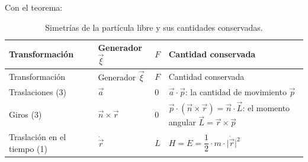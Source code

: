 \documentclass[11pt,a4paper,spanish]{book}
\begin{document}
Con el teorema:

\begin{longtable}[]{@{}
  >{\raggedright\arraybackslash}p{}
  >{\raggedright\arraybackslash}p{}
  >{\raggedright\arraybackslash}p{}
  >{\raggedright\arraybackslash}p{}@{}}
\caption{Simetrías de la partícula libre y sus cantidades
conservadas.}\tabularnewline
\toprule\noalign{}
\begin{minipage}[b]{\linewidth}\raggedright
Transformación
\end{minipage} & \begin{minipage}[b]{\linewidth}\raggedright
Generador \(\vec{\xi}\)
\end{minipage} & \begin{minipage}[b]{\linewidth}\raggedright
\(F\)
\end{minipage} & \begin{minipage}[b]{\linewidth}\raggedright
Cantidad conservada
\end{minipage} \\
\midrule\noalign{}
\endfirsthead
\toprule\noalign{}
\begin{minipage}[b]{\linewidth}\raggedright
Transformación
\end{minipage} & \begin{minipage}[b]{\linewidth}\raggedright
Generador \(\vec{\xi}\)
\end{minipage} & \begin{minipage}[b]{\linewidth}\raggedright
\(F\)
\end{minipage} & \begin{minipage}[b]{\linewidth}\raggedright
Cantidad conservada
\end{minipage} \\
\midrule\noalign{}
\endhead
\bottomrule\noalign{}
\endlastfoot
Traslaciones (3) & \(\vec{a}\) & \(0\) & \(\vec{a} \cdot \vec{p}\): la
cantidad de movimiento \(\vec{p}\) \\
Giros (3) & \(\vec{n} \times \vec{r}\) & \(0\) &
\(\vec{p} \cdot (\vec{n} \times \vec{r}) = \vec{n} \cdot \vec{L}\): el
momento angular \(\vec{L} = \vec{r} \times \vec{p}\) \\
Traslación en el tiempo (1) & \(\dot{\vec{r}}\) & \(L\) &
\(H = E = \dfrac{1}{2} \cdot m \cdot \lvert\dot{\vec{r}}\rvert^2\) \\
\end{longtable}
\end{document}
